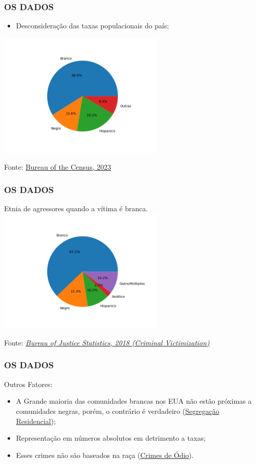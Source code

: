 \documentclass[compress,12pt]{beamer}
\begin{document}
\begin{frame}
    \frametitle{OS DADOS}
    \begin{itemize}
        \item Desconsideração das taxas populacionais do país;
    \end{itemize}
    \centering
    \includegraphics[width=80mm]{Imagens/Taxa Populacional Americana.png}
    
    Fonte: \href{https://www.census.gov/quickfacts/fact/table/US/}{Bureau of the Census, 2023}
    
\end{frame}

\begin{frame}
    \frametitle{OS DADOS}
    \centering
    Etnia de agressores quando a vítima é branca.
    \includegraphics[width=80mm]{Imagens/Agressores Contra Brancos.png}
    
    Fonte: \href{https://bjs.ojp.gov/content/pub/pdf/cv18.pdf}{\textit{Bureau of Justice Statistics, 2018 (Criminal Victimization)}}
\end{frame}

\begin{frame}
    \frametitle{OS DADOS}
    Outros Fatores:
    \begin{itemize}
        \item A Grande maioria das comunidades brancas nos EUA não estão próximas a comunidades negras, porém, o contrário é verdadeiro (\href{https://www.nytimes.com/interactive/2015/07/08/us/census-race-map.html}{Segregação Residencial});
        \item Representação em números absolutos em detrimento a taxas;
        \item Esses crimes não são baseados na raça (\href{https://www.justice.gov/hatecrimes/learn-about-hate-crimes}{Crimes de Ódio}).
    \end{itemize}
\end{frame}
\end{document}
